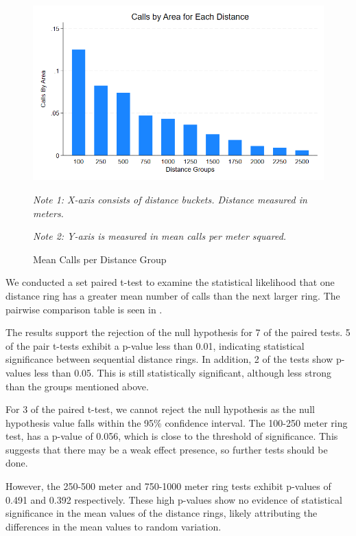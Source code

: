 \documentclass[12pt]{article}
\begin{document}
\begin{figure}[!h]
    \centering
    \includegraphics[width=1\linewidth]{Reproducibility Package//Visual Graphics/Avg_Calls_per_Distance_Group.png}
    \caption{Mean Calls per Distance Group}
    \label{fig: Average Number of Calls per Distance Group}
      \textit{Note 1: X-axis consists of distance buckets. Distance measured in meters.}

      \textit{Note 2: Y-axis is measured in mean calls per meter squared.}
\end{figure}

We conducted a set paired t-test to examine the statistical likelihood that one distance ring has a greater mean number of calls than the next larger ring. The pairwise comparison table is seen in .

The results support the rejection of the null hypothesis for 7 of the paired tests. 5 of the pair t-tests exhibit a p-value less than 0.01, indicating statistical significance between sequential distance rings. In addition, 2 of the tests show p-values less than 0.05. This is still statistically significant, although less strong than the groups mentioned above. 

For 3 of the paired t-test, we cannot reject the null hypothesis as the null hypothesis value falls within the 95\% confidence interval. The 100-250 meter ring test, has a p-value of 0.056, which is close to the threshold of significance. This suggests that there may be a weak effect presence, so further tests should be done.

However, the 250-500 meter and 750-1000 meter ring tests exhibit p-values of 0.491 and 0.392 respectively. These high p-values show no evidence of statistical significance in the mean values of the distance rings, likely attributing the differences in the mean values to random variation.
\end{document}
